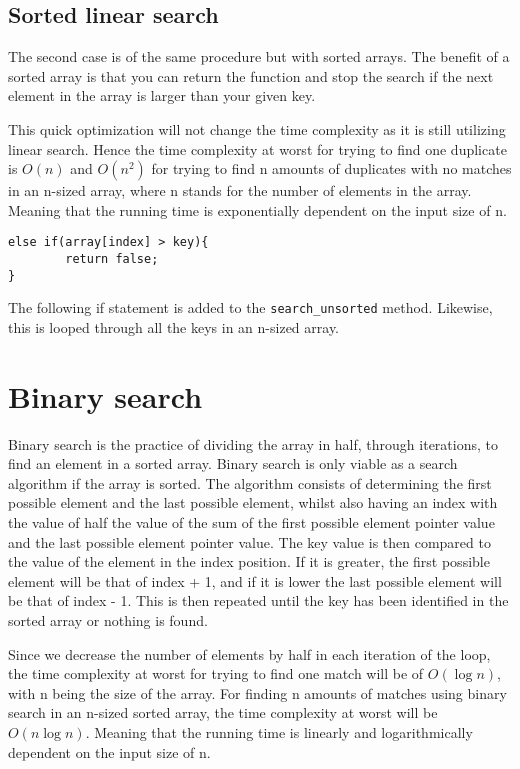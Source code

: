 \documentclass[a4paper,11pt]{article}
\begin{document}
    \subsection*{Sorted linear search}

        The second case is of the same procedure but with sorted arrays. The benefit of a sorted array is that you can return the function and stop the search if the next element in the array is larger than your given key. 
        
        This quick optimization will not change the time complexity as it is still utilizing linear search. Hence the time complexity at worst for trying to find one duplicate is $O(n)$ and $O(n^2)$ for trying to find n amounts of duplicates with no matches in an n-sized array, where n stands for the number of elements in the array. Meaning that the running time is exponentially dependent on the input size of n. 
\begin{verbatim}
else if(array[index] > key){
        return false;
}
\end{verbatim}
        The following if statement is added to the \texttt{search\_unsorted} method. Likewise, this is looped through all the keys in an n-sized array.
        
\section*{Binary search}

    Binary search is the practice of dividing the array in half, through iterations, to find an element in a sorted array. Binary search is only viable as a search algorithm if the array is sorted. The algorithm consists of determining the first possible element and the last possible element, whilst also having an index with the value of half the value of the sum of the first possible element pointer value and the last possible element pointer value. The key value is then compared to the value of the element in the index position. If it is greater, the first possible element will be that of index + 1, and if it is lower the last possible element will be that of index - 1. This is then repeated until the key has been identified in the sorted array or nothing is found. 
    
    Since we decrease the number of elements by half in each iteration of the loop, the time complexity at worst for trying to find one match will be of $O(\log n)$, with n being the size of the array. For finding n amounts of matches using binary search in an n-sized sorted array, the time complexity at worst will be $O(n \log n)$. Meaning that the running time is linearly and logarithmically dependent on the input size of n.
\end{document}
